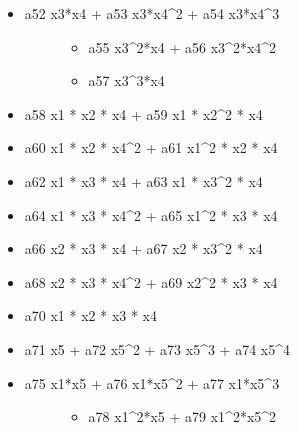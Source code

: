 \documentclass[letterpaper,10pt,english]{sphinxmanual}
\begin{document}
\begin{fulllineitems}
\begin{description}
\begin{itemize}
\begin{description}
\begin{itemize}
\end{itemize}

\end{description}

\item {} \begin{description}
\item[{a52 x3*x4 + a53 x3*x4\textasciicircum{}2 + a54  x3*x4\textasciicircum{}3}] \leavevmode\begin{itemize}
\item {} 
a55 x3\textasciicircum{}2*x4 + a56  x3\textasciicircum{}2*x4\textasciicircum{}2

\item {} 
a57 x3\textasciicircum{}3*x4

\end{itemize}

\end{description}

\item {} 
a58 x1 * x2 * x4 + a59 x1 * x2\textasciicircum{}2 * x4

\item {} 
a60 x1 * x2 * x4\textasciicircum{}2 + a61 x1\textasciicircum{}2 * x2 * x4

\item {} 
a62 x1 * x3 * x4 + a63 x1 * x3\textasciicircum{}2 * x4

\item {} 
a64 x1 * x3 * x4\textasciicircum{}2 + a65 x1\textasciicircum{}2 * x3 * x4

\item {} 
a66 x2 * x3 * x4 + a67 x2 * x3\textasciicircum{}2 * x4

\item {} 
a68 x2 * x3 * x4\textasciicircum{}2 + a69 x2\textasciicircum{}2 * x3 * x4

\item {} 
a70 x1 * x2 * x3 * x4

\item {} 
a71 x5 + a72 x5\textasciicircum{}2 + a73 x5\textasciicircum{}3 + a74 x5\textasciicircum{}4

\item {} \begin{description}
\item[{a75 x1*x5 + a76 x1*x5\textasciicircum{}2 + a77 x1*x5\textasciicircum{}3}] \leavevmode\begin{itemize}
\item {} 
a78 x1\textasciicircum{}2*x5 + a79 x1\textasciicircum{}2*x5\textasciicircum{}2


\end{itemize}
\end{description}
\end{itemize}
\end{description}
\end{fulllineitems}
\end{document}
